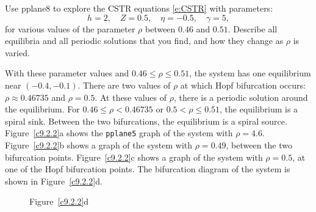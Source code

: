 \documentclass{ximera}
\begin{document}
\begin{exercise} \label{c9.2.2}
Use {\sf pplane8} to explore the CSTR equations \eqref{e:CSTR} with
parameters:
\[
h=2, \quad Z=0.5, \quad \eta=-0.5, \quad \gamma=5,
\]
for various values of the parameter $\rho$ between $0.46$ and 
$0.51$.  Describe all equilibria and all periodic solutions that 
you find, and how they change as $\rho$ is varied.

\begin{solution}

With these parameter values and $0.46 \leq \rho \leq 0.51$, the system
has one equilibrium near $(-0.4,-0.1)$.  There are two values of $\rho$
at which Hopf bifurcation occurs: $\rho \approx 0.46735$ and
$\rho = 0.5$.  At these values of $\rho$, there is a periodic solution
around the equilibrium.  For $0.46 \leq \rho < 0.46735$ or $0.5 < \rho
\leq 0.51$, the equilibrium is a spiral sink.  Between the two
bifurcations, the equilibrium is a spiral source.  Figure~\ref{c9.2.2}a
shows the {\tt pplane5} graph of the system with $\rho = 4.6$. 
Figure~\ref{c9.2.2}b shows a graph of the system with $\rho = 0.49$,
between the two bifurcation points.  Figure~\ref{c9.2.2}c shows a graph
of the system with $\rho = 0.5$, at one of the Hopf bifurcation points.
The bifurcation diagram of the system is shown in Figure~\ref{c9.2.2}d.

\begin{figure}[htb]
                       \centerline{%
                       }
\end{figure}

\begin{figure}[htb]
			\centerline{%
			}
		\centerline{Figure~\ref{c9.2.2}d}
\end{figure}




\end{solution}
\end{exercise}
\end{document}
